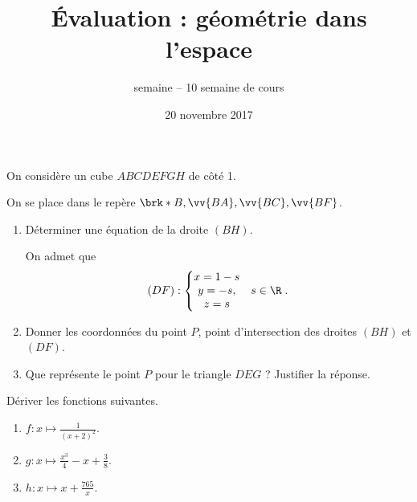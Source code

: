 \documentclass[a4paper,12pt,frenchb]{article}
\title{Évaluation : géométrie dans l'espace}
\author{semaine \no{47} -- 10\up{ième} semaine de cours}
\date{20 novembre 2017}
\begin{document}
\maketitle

\thispagestyle{fancy}

\begin{question}[subtitle={septembre 2016, antilles-guyanne, 2 points}]

  On considère un cube $ABCDEFGH$ de côté 1.

  \begin{center}
  \end{center}

  On se place dans le repère $\brk*{B,\vv{BA}, \vv{BC}, \vv{BF}}$.
  \begin{enumerate}
    \item Déterminer une équation de la droite $(BH)$.

      On admet que \[ (DF) : \left\{ \begin{matrix} x= 1 - s & \\ y = -s ,&
      s \in \R \\ z = s & \\ \end{matrix} \right. . \]
    \item Donner les coordonnées du point $P$, point d'intersection des
      droites $(BH)$ et $(DF)$.
    \item Que représente le point $P$ pour le triangle $DEG$ ? Justifier la
      réponse.
  \end{enumerate}
\end{question}

\begin{question}
  Dériver les fonctions suivantes.

  \begin{enumerate}
    \item $f \colon x \mapsto \frac1{(x+2)^2}$.
    \item $g \colon x \mapsto \frac{x^3}4 -x + \frac38$.
    \item $h \colon x \mapsto x + \frac{765}x$.
  \end{enumerate}
\end{question}
\end{document}
